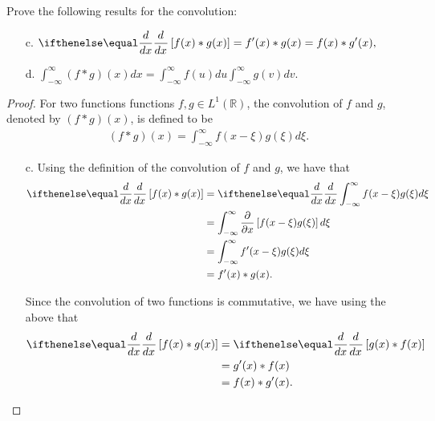 \begin{problem}{2.7}
  Prove the following results for the convolution:
  \begin{enumerate}
    \item [c.] $\displaystyle \der{x}{}\left[f(x) \ast g(x)\right] = f'(x) \ast g(x) = f(x) \ast g'(x),$
    \item [d.] $\displaystyle \int_{-\infty}^{\infty} (f \ast g)(x) dx = \int_{-\infty}^{\infty} f(u)du \int_{-\infty}^{\infty} g(v)dv.$
  \end{enumerate}
\end{problem}

\begin{proof}
  For two functions functions $f, g \in L^1(\mathbb{R})$, the convolution of $f$ and $g$,
  denoted by $(f \ast g )(x)$, is defined to be
  \begin{align*}
    (f \ast g )(x) = \int_{-\infty}^{\infty} f(x - \xi) g(\xi) d\xi.
  \end{align*}

  \begin{enumerate}
    \item [c.] Using the definition of the convolution of $f$ and $g$, we have that
      \begin{align*}
        \der{x}{}\left[f(x) \ast g(x)\right] &= \der{x}{}\int_{-\infty}^{\infty} f(x - \xi) g(\xi) d\xi \\
        &= \int_{-\infty}^{\infty} \frac{\partial}{\partial x}\left[f(x - \xi) g(\xi)\right] d\xi \\
        &= \int_{-\infty}^{\infty} f'(x - \xi) g(\xi)d\xi \\
        &= f'(x) \ast g(x).
      \end{align*}

      Since the convolution of two functions is commutative, we have using the above that
      \begin{align*}
        \der{x}{}\left[f(x) \ast g(x)\right] &= \der{x}{}\left[g(x) \ast f(x)\right] \\
        &= g'(x) \ast f(x) \\
        &= f(x) \ast g'(x).
      \end{align*}


\end{enumerate}
\end{proof}
